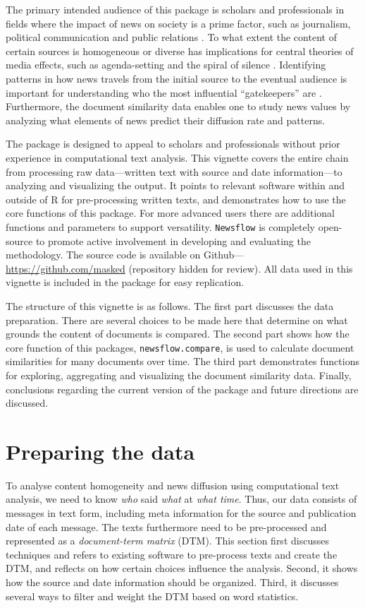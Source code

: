 \documentclass[]{article}
\begin{document}
The primary intended audience of this package is scholars and
professionals in fields where the impact of news on society is a prime
factor, such as journalism, political communication and public relations
\citep{baum08, boczkowski07, ragas14}. To what extent the content of
certain sources is homogeneous or diverse has implications for central
theories of media effects, such as agenda-setting and the spiral of
silence \citep{bennett08, blumler99}. Identifying patterns in how news
travels from the initial source to the eventual audience is important
for understanding who the most influential ``gatekeepers'' are
\citep{shoemaker09}. Furthermore, the document similarity data enables
one to study news values \citep{galtung65} by analyzing what elements of
news predict their diffusion rate and patterns.

The package is designed to appeal to scholars and professionals without
prior experience in computational text analysis. This vignette covers
the entire chain from processing raw data---written text with source and
date information---to analyzing and visualizing the output. It points to
relevant software within and outside of R for pre-processing written
texts, and demonstrates how to use the core functions of this package.
For more advanced users there are additional functions and parameters to
support versatility. \texttt{Newsflow} is completely open-source to
promote active involvement in developing and evaluating the methodology.
The source code is available on Github---\url{https://github.com/masked}
(repository hidden for review). All data used in this vignette is
included in the package for easy replication.

The structure of this vignette is as follows. The first part discusses
the data preparation. There are several choices to be made here that
determine on what grounds the content of documents is compared. The
second part shows how the core function of this packages,
\texttt{newsflow.compare}, is used to calculate document similarities
for many documents over time. The third part demonstrates functions for
exploring, aggregating and visualizing the document similarity data.
Finally, conclusions regarding the current version of the package and
future directions are discussed.

\section{Preparing the data}\label{preparing-the-data}

To analyse content homogeneity and news diffusion using computational
text analysis, we need to know \emph{who} said \emph{what} at \emph{what
time}. Thus, our data consists of messages in text form, including meta
information for the source and publication date of each message. The
texts furthermore need to be pre-processed and represented as a
\emph{document-term matrix} (DTM). This section first discusses
techniques and refers to existing software to pre-process texts and
create the DTM, and reflects on how certain choices influence the
analysis. Second, it shows how the source and date information should be
organized. Third, it discusses several ways to filter and weight the DTM
based on word statistics.
\end{document}
